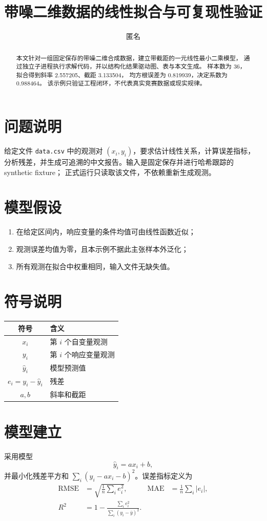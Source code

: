 \documentclass[UTF8,a4paper,11pt]{ctexart}
\title{带噪二维数据的线性拟合与可复现性验证}
\author{匿名}
\date{}
\begin{document}
\maketitle

\begin{abstract}
本文针对一组固定保存的带噪二维合成数据，建立带截距的一元线性最小二乘模型，
通过独立子进程执行求解代码，并以结构化结果驱动图、表与本文生成。
样本数为 36，拟合得到斜率 2.557205、截距 3.133504，
均方根误差为 0.819939，决定系数为 0.988464。
该示例只验证工程闭环，不代表真实竞赛数据或现实规律。
\end{abstract}

\section{问题说明}
给定文件 \texttt{data.csv} 中的观测对 $(x_i,y_i)$，要求估计线性关系，计算误差指标，
分析残差，并生成可追溯的中文报告。输入是固定保存并进行哈希跟踪的 synthetic fixture；
正式运行只读取该文件，不依赖重新生成观测。

\section{模型假设}
\begin{enumerate}
  \item 在给定区间内，响应变量的条件均值可由线性函数近似；
  \item 观测误差均值为零，且本示例不据此主张样本外泛化；
  \item 所有观测在拟合中权重相同，输入文件无缺失值。
\end{enumerate}

\section{符号说明}
\begin{center}
\begin{tabular}{cl}
\toprule
符号 & 含义 \\
\midrule
$x_i$ & 第 $i$ 个自变量观测 \\
$y_i$ & 第 $i$ 个响应变量观测 \\
$\hat y_i$ & 模型预测值 \\
$e_i=y_i-\hat y_i$ & 残差 \\
$a,b$ & 斜率和截距 \\
\bottomrule
\end{tabular}
\end{center}

\section{模型建立}
采用模型
\begin{equation}
  \hat y_i = a x_i + b,
\end{equation}
并最小化残差平方和 $\sum_i(y_i-a x_i-b)^2$。误差指标定义为
\begin{align}
\mathrm{RMSE} &= \sqrt{\frac1n\sum_i e_i^2}, &
\mathrm{MAE} &= \frac1n\sum_i |e_i|, \\
R^2 &= 1-\frac{\sum_i e_i^2}{\sum_i(y_i-\bar y)^2}.
\end{align}
\end{document}
